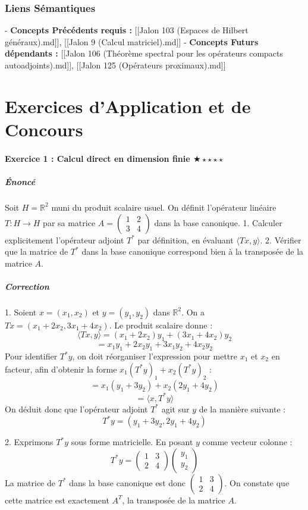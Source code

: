 \documentclass[11pt,a4paper]{article}
\begin{document}
\section{Liens Sémantiques}

- \textbf{Concepts Précédents requis :} [[Jalon 103 (Espaces de Hilbert généraux).md]], [[Jalon 9 (Calcul matriciel).md]]
- \textbf{Concepts Futurs dépendants :} [[Jalon 106 (Théorème spectral pour les opérateurs compacts autoadjoints).md]], [[Jalon 125 (Opérateurs proximaux).md]]


\part{Exercices d'Application et de Concours}
\subsection*{Exercice 1 : Calcul direct en dimension finie $\bigstar\star\star\star\star$}
\subsubsection*{Énoncé}
Soit $H = \mathbb{R}^2$ muni du produit scalaire usuel. On définit l'opérateur linéaire $T : H \to H$ par sa matrice $A = \begin{pmatrix} 1 & 2 \\ 3 & 4 \end{pmatrix}$ dans la base canonique.
1. Calculer explicitement l'opérateur adjoint $T^*$ par définition, en évaluant $\langle Tx, y \rangle$.
2. Vérifier que la matrice de $T^*$ dans la base canonique correspond bien à la transposée de la matrice $A$.

\subsubsection*{Correction}
1. Soient $x = (x_1, x_2)$ et $y = (y_1, y_2)$ dans $\mathbb{R}^2$.
On a $Tx = (x_1 + 2x_2, 3x_1 + 4x_2)$.
Le produit scalaire donne :
$$ \langle Tx, y \rangle = (x_1 + 2x_2)y_1 + (3x_1 + 4x_2)y_2 $$
$$ = x_1 y_1 + 2 x_2 y_1 + 3 x_1 y_2 + 4 x_2 y_2 $$
Pour identifier $T^*y$, on doit réorganiser l'expression pour mettre $x_1$ et $x_2$ en facteur, afin d'obtenir la forme $x_1 (T^*y)_1 + x_2 (T^*y)_2$ :
$$ = x_1 (y_1 + 3y_2) + x_2 (2y_1 + 4y_2) $$
$$ = \langle x, T^*y \rangle $$
On déduit donc que l'opérateur adjoint $T^*$ agit sur $y$ de la manière suivante :
$$ T^*y = (y_1 + 3y_2, 2y_1 + 4y_2) $$

2. Exprimons $T^*y$ sous forme matricielle. En posant $y$ comme vecteur colonne :
$$ T^*y = \begin{pmatrix} 1 & 3 \\ 2 & 4 \end{pmatrix} \begin{pmatrix} y_1 \\ y_2 \end{pmatrix} $$
La matrice de $T^*$ dans la base canonique est donc $\begin{pmatrix} 1 & 3 \\ 2 & 4 \end{pmatrix}$.
On constate que cette matrice est exactement $A^T$, la transposée de la matrice $A$.
\end{document}
